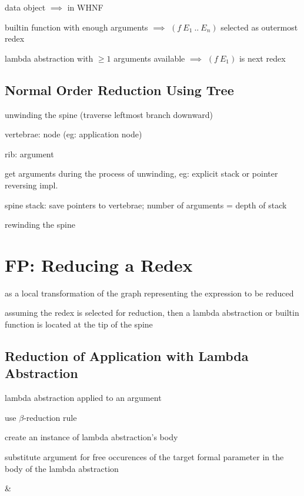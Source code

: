 \documentclass[8pt]{extarticle}
\begin{document}
\begin{multicols*}{2}
data object $\implies$ in WHNF

builtin function with enough arguments $\implies$ $(f\ E_1\ ..\ E_n)$ selected as outermost redex

lambda abstraction with $\geq 1$ arguments available $\implies$ $(f\ E_1)$ is next redex

\subsection{Normal Order Reduction Using Tree}
unwinding the spine (traverse leftmost branch downward)

vertebrae: node (eg: application node)

rib: argument

get arguments during the process of unwinding, eg: explicit stack or pointer reversing impl.

spine stack: save pointers to vertebrae; number of arguments = depth of stack

rewinding the spine

\vfill\null
\columnbreak

\section{FP: Reducing a Redex}

as a local transformation of the graph representing the expression to be reduced

assuming the redex is selected for reduction, then a lambda abstraction or builtin function is located at the tip of the spine

\subsection{Reduction of Application with Lambda Abstraction}

lambda abstraction applied to an argument

use $\beta$-reduction rule

create an instance of lambda abstraction's body

substitute argument for free occurences of the target formal parameter in the body of the lambda abstraction


\begin{tblr}[]{}
 & 


\end{tblr}
\end{multicols*}
\end{document}
